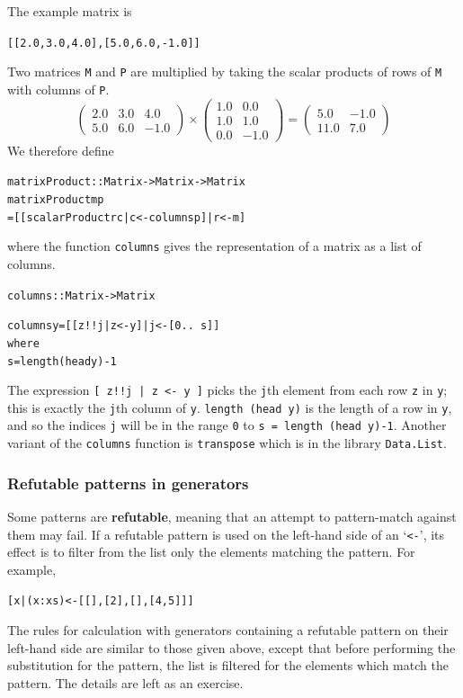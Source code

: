 The example matrix is 
\begin{alltt}
[[2.0,3.0,4.0],[5.0,6.0,-1.0]]
\end{alltt}
Two matrices \texttt{M} and 
\texttt{P} are multiplied by taking the scalar products of rows of \texttt{M} with
columns of \texttt{P}.
\[ 
\left( \begin{array}{rrr} 2.0 & 3.0 & 4.0 \\ 5.0 & 6.0 & -1.0 \end{array} \right)
\times
\left( \begin{array}{rr} 1.0 & 0.0 \\ 1.0 & 1.0 \\ 0.0 & -1.0 \end{array} \right)
= 
\left( \begin{array}{rr} 5.0 & -1.0 \\ 11.0 & 7.0 \end{array} \right)
\]
We therefore define
\begin{alltt}
matrixProduct :: Matrix -> Matrix -> Matrix
matrixProduct m p
  = [ [scalarProduct r c | c <- columns p] | r <- m ]
\end{alltt}
where the function \texttt{columns} gives the representation of a matrix as a
list of columns.
\begin{alltt}
columns :: Matrix -> Matrix

columns y = [ [ z!!j | z <- y ] | j <- [0 ..\ s] ]
            where 
            s = length (head y)-1
\end{alltt}
The expression \texttt{[ z!!j | z <- y ]} picks the \texttt{j}th element from 
each row \texttt{z} in \texttt{y}; this is exactly the \texttt{j}th 
column of \texttt{y}. \texttt{length (head y)}
is the length of a row in \texttt{y}, and so
the indices \texttt{j} will be in the range \texttt{0} to \texttt{s =
length (head y)-1}. Another variant of the \texttt{columns} function is
\texttt{transpose} which is in the library \texttt{Data.List}.

\subsubsection*{Refutable patterns in generators}

Some patterns are \textbf{refutable}, meaning that
an attempt to pattern-match against them may fail. If a refutable pattern is
used on the left-hand side of an `\texttt{<-}', its effect is to filter from the
list only the elements matching the pattern. For example,
\begin{alltt}
[ x | (x:xs) <- [[],[2],[],[4,5]] ] \step [2,4]
\end{alltt}
The rules for calculation with generators containing a refutable pattern on
their left-hand side are similar to those given above,
except that before performing the
substitution for the pattern, the list is filtered for the elements which
match the pattern. The details are left as an exercise.

